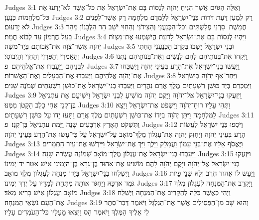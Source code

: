 Judges 3:1	וְאֵלֶּה הַגּוֹיִם אֲשֶׁר הִנִּיחַ יְהֹוָה לְנַסּוֹת בָּם אֶת־יִשְׂרָאֵל אֵת כּל־אֲשֶׁר לֹא־יָדְעוּ אֵת כּל־מִלְחֲמוֹת כְּנָעַן׃
Judges 3:2	רַק לְמַעַן דַּעַת דֹּרוֹת בְּנֵי־יִשְׂרָאֵל לְלַמְּדָם מִלְחָמָה רַק אֲשֶׁר־לְפָנִים לֹא יְדָעוּם׃
Judges 3:3	חֲמֵשֶׁת  סַרְנֵי פְלִשְׁתִּים וְכל־הַכְּנַעֲנִי וְהַצִּידֹנִי וְהַחִוִּי יֹשֵׁב הַר הַלְּבָנוֹן מֵהַר בַּעַל חֶרְמוֹן עַד לְבוֹא חֲמָת׃
Judges 3:4	וַיִּהְיוּ לְנַסּוֹת בָּם אֶת־יִשְׂרָאֵל לָדַעַת הֲיִשְׁמְעוּ אֶת־מִצְוֺת יְהֹוָה אֲשֶׁר־צִוָּה אֶת־אֲבוֹתָם בְּיַד־מֹשֶׁה׃
Judges 3:5	וּבְנֵי יִשְׂרָאֵל יָשְׁבוּ בְּקֶרֶב הַכְּנַעֲנִי הַחִתִּי וְהָאֱמֹרִי וְהַפְּרִזִּי וְהַחִוִּי וְהַיְבוּסִי׃
Judges 3:6	וַיִּקְחוּ אֶת־בְּנוֹתֵיהֶם לָהֶם לְנָשִׁים וְאֶת־בְּנוֹתֵיהֶם נָתְנוּ לִבְנֵיהֶם וַיַּעַבְדוּ אֶת־אֱלֹהֵיהֶם׃ {פ}
Judges 3:7	וַיַּעֲשׂוּ בְנֵי־יִשְׂרָאֵל אֶת־הָרַע בְּעֵינֵי יְהֹוָה וַיִּשְׁכְּחוּ אֶת־יְהֹוָה אֱלֹהֵיהֶם וַיַּעַבְדוּ אֶת־הַבְּעָלִים וְאֶת־הָאֲשֵׁרוֹת׃
Judges 3:8	וַיִּחַר־אַף יְהֹוָה בְּיִשְׂרָאֵל וַיִּמְכְּרֵם בְּיַד כּוּשַׁן רִשְׁעָתַיִם מֶלֶךְ אֲרַם נַהֲרָיִם וַיַּעַבְדוּ בְנֵי־יִשְׂרָאֵל אֶת־כּוּשַׁן רִשְׁעָתַיִם שְׁמֹנֶה שָׁנִים׃
Judges 3:9	וַיִּזְעֲקוּ בְנֵי־יִשְׂרָאֵל אֶל־יְהֹוָה וַיָּקֶם יְהֹוָה מוֹשִׁיעַ לִבְנֵי יִשְׂרָאֵל וַיֹּשִׁיעֵם אֵת עתְנִיאֵל בֶּן־קְנַז אֲחִי כָלֵב הַקָּטֹן מִמֶּנּוּ׃
Judges 3:10	וַתְּהִי עָלָיו רוּחַ־יְהֹוָה וַיִּשְׁפֹּט אֶת־יִשְׂרָאֵל וַיֵּצֵא לַמִּלְחָמָה וַיִּתֵּן יְהֹוָה בְּיָדוֹ אֶת־כּוּשַׁן רִשְׁעָתַיִם מֶלֶךְ אֲרָם וַתָּעז יָדוֹ עַל כּוּשַׁן רִשְׁעָתָיִם׃
Judges 3:11	וַתִּשְׁקֹט הָאָרֶץ אַרְבָּעִים שָׁנָה וַיָּמת עתְנִיאֵל בֶּן־קְנַז׃ {פ}
Judges 3:12	וַיֹּסִפוּ בְּנֵי יִשְׂרָאֵל לַעֲשׂוֹת הָרַע בְּעֵינֵי יְהֹוָה וַיְחַזֵּק יְהֹוָה אֶת־עֶגְלוֹן מֶלֶךְ־מוֹאָב עַל־יִשְׂרָאֵל עַל כִּי־עָשׂוּ אֶת־הָרַע בְּעֵינֵי יְהֹוָה׃
Judges 3:13	וַיֶּאֱסֹף אֵלָיו אֶת־בְּנֵי עַמּוֹן וַעֲמָלֵק וַיֵּלֶךְ וַיַּךְ אֶת־יִשְׂרָאֵל וַיִּירְשׁוּ אֶת־עִיר הַתְּמָרִים׃
Judges 3:14	וַיַּעַבְדוּ בְנֵי־יִשְׂרָאֵל אֶת־עֶגְלוֹן מֶלֶךְ־מוֹאָב שְׁמוֹנֶה עֶשְׂרֵה שָׁנָה׃
Judges 3:15	וַיִּזְעֲקוּ בְנֵי־יִשְׂרָאֵל אֶל־יְהֹוָה וַיָּקֶם יְהֹוָה לָהֶם מוֹשִׁיעַ אֶת־אֵהוּד בֶּן־גֵּרָא בֶּן־הַיְמִינִי אִישׁ אִטֵּר יַד־יְמִינוֹ וַיִּשְׁלְחוּ בְנֵי־יִשְׂרָאֵל בְּיָדוֹ מִנְחָה לְעֶגְלוֹן מֶלֶךְ מוֹאָב׃
Judges 3:16	וַיַּעַשׂ לוֹ אֵהוּד חֶרֶב וְלָהּ שְׁנֵי פֵיוֹת גֹּמֶד ארְכָּהּ וַיַּחְגֹּר אוֹתָהּ מִתַּחַת לְמַדָּיו עַל יֶרֶךְ יְמִינוֹ׃
Judges 3:17	וַיַּקְרֵב אֶת־הַמִּנְחָה לְעֶגְלוֹן מֶלֶךְ מוֹאָב וְעֶגְלוֹן אִישׁ בָּרִיא מְאֹד׃
Judges 3:18	וַיְהִי כַּאֲשֶׁר כִּלָּה לְהַקְרִיב אֶת־הַמִּנְחָה וַיְשַׁלַּח אֶת־הָעָם נֹשְׂאֵי הַמִּנְחָה׃
Judges 3:19	וְהוּא שָׁב מִן־הַפְּסִילִים אֲשֶׁר אֶת־הַגִּלְגָּל וַיֹּאמֶר דְּבַר־סֵתֶר לִי אֵלֶיךָ הַמֶּלֶךְ וַיֹּאמֶר הָס וַיֵּצְאוּ מֵעָלָיו כּל־הָעֹמְדִים עָלָיו׃
